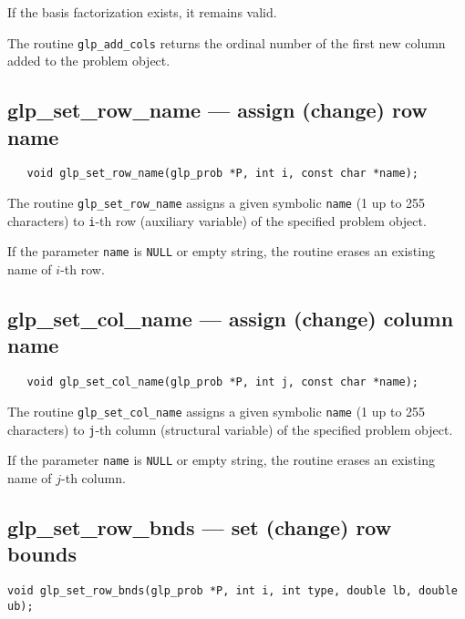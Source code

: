 If the basis factorization exists, it remains valid.

\returns

The routine \verb|glp_add_cols| returns the ordinal number of the first
new column added to the problem object.

\subsection{glp\_set\_row\_name --- assign (change) row name}

\synopsis

\begin{verbatim}
   void glp_set_row_name(glp_prob *P, int i, const char *name);
\end{verbatim}

\description

The routine \verb|glp_set_row_name| assigns a given symbolic
\verb|name| (1 up to 255 characters) to \verb|i|-th row (auxiliary
variable) of the specified problem object.

If the parameter \verb|name| is \verb|NULL| or empty string, the
routine erases an existing name of $i$-th row.

\subsection{glp\_set\_col\_name --- assign (change) column name}

\synopsis

\begin{verbatim}
   void glp_set_col_name(glp_prob *P, int j, const char *name);
\end{verbatim}

\description

The routine \verb|glp_set_col_name| assigns a given symbolic
\verb|name| (1 up to 255 characters) to \verb|j|-th column (structural
variable) of the specified problem object.

If the parameter \verb|name| is \verb|NULL| or empty string, the
routine erases an existing name of $j$-th column.

\subsection{glp\_set\_row\_bnds --- set (change) row bounds}

\synopsis

{\tt void glp\_set\_row\_bnds(glp\_prob *P, int i, int type,
double lb, double ub);}

